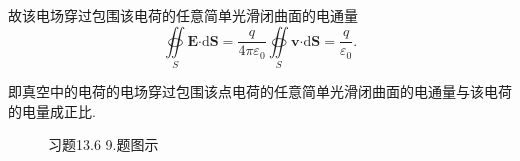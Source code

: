 \documentclass[12pt,UTF8,fleqn]{ctexart}
\newcommand{\md}[1]{\mathrm d#1}
\newcommand{\BSOIInt}[2]{\oiint\limits_{#1}#2}
\begin{document}
\begin{enumerate}
{故该电场穿过包围该电荷的任意简单光滑闭曲面的电通量
\[\BSOIInt S{\bm E\bm\cdot\md\bm S}=\frac q{4\pi\varepsilon_0}\BSOIInt S{\bm v\bm\cdot\md\bm S}=\frac q{\varepsilon_0}.\]

即真空中的电荷的电场穿过包围该点电荷的任意简单光滑闭曲面的电通量与该电荷的电量成正比.

}

\begin{figure}[H]
\begin{center}
\end{center}
\end{figure}
\addtocounter{figure}{-1}
\begin{figure}[H]
\addtocounter{figure}{1}
\begin{center}
\end{center}
\caption{习题13.6 9.题图示}
\label{13-6-9}
\end{figure}


\end{enumerate}
\end{document}
